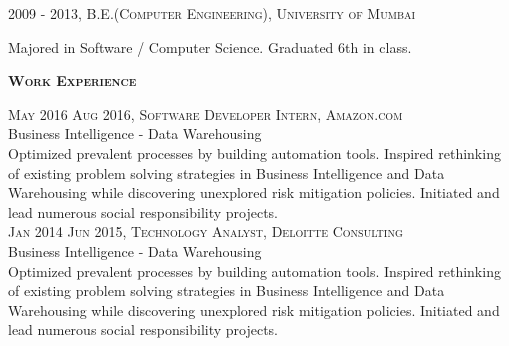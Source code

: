 \documentclass[letterpaper,12pt,final]{memoir}
\newcommand{\SmallSep}{\vspace{0.5em}}
\newcommand{\CVSection}[1]
	{\Large\textbf{\textsc{{#1}}}\par
	\SmallSep\normalsize\normalfont}
\newcommand{\CVItem}[1]
	{\textsc{\color{Plum} #1}}
\begin{document}
\CVItem{2009 - 2013, B.E.(Computer Engineering), University of \allowbreak  Mumbai}\\
 \begin{footnotesize}
 	Majored in Software / Computer Science. Graduated 6th in class.
 \end{footnotesize}
\SmallSep

\CVSection{Work Experience}
\CVItem{May 2016 \textendash \space Aug 2016, Software Developer Intern, Amazon.com}\\
\SmallSep
Business Intelligence - Data Warehousing\\
{\footnotesize Optimized prevalent processes by building automation tools. Inspired rethinking of existing problem solving strategies in Business Intelligence and Data Warehousing while discovering unexplored risk mitigation policies. Initiated and lead numerous social responsibility projects.}
\SmallSep\\
\CVItem{Jan 2014 \textendash \space Jun 2015, Technology Analyst, Deloitte Consulting}\\
\SmallSep
Business Intelligence - Data Warehousing\\
{\footnotesize Optimized prevalent processes by building automation tools. Inspired rethinking of existing problem solving strategies in Business Intelligence and Data Warehousing while discovering unexplored risk mitigation policies. Initiated and lead numerous social responsibility projects.}
\SmallSep
\end{document}

